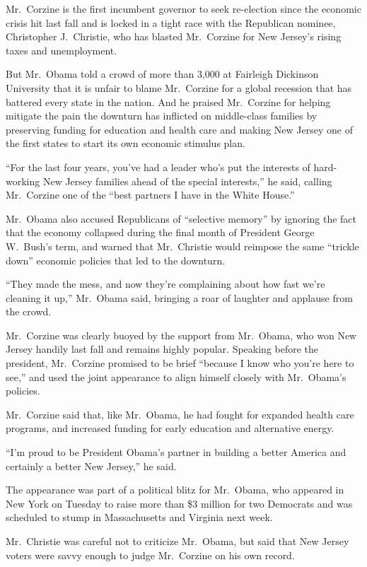 ﻿\documentclass[12pt]{article}
\begin{document}
Mr.~Corzine is the first incumbent governor to seek re-election since the economic crisis hit last
fall and is locked in a tight race with the Republican nominee, Christopher J.~Christie, who has
blasted Mr.~Corzine for New Jersey's rising taxes and unemployment.

But Mr.~Obama told a crowd of more than 3,000 at Fairleigh Dickinson University that it is unfair to
blame Mr.~Corzine for a global recession that has battered every state in the nation. And he praised
Mr.~Corzine for helping mitigate\cite{mitigate} the pain the downturn has inflicted on middle-class
families by preserving funding for education and health care and making New Jersey one of the first
states to start its own economic stimulus plan.

``For the last four years, you've had a leader who's put the interests of hard-working New Jersey
families ahead of the special interests,'' he said, calling Mr.~Corzine one of the ``best partners I
have in the White House.''

Mr.~Obama also accused Republicans of ``selective memory'' by ignoring the fact that the economy
collapsed during the final month of President George W.~Bush's term, and warned that Mr.~Christie
would reimpose the same ``trickle down'' economic policies that led to the downturn.

``They made the mess, and now they're complaining about how fast we're cleaning it up,'' Mr.~Obama
said, bringing a roar of laughter and applause from the crowd.

Mr.~Corzine was clearly buoyed by the support from Mr.~Obama, who won New Jersey handily last fall
and remains highly popular. Speaking before the president, Mr.~Corzine promised to be brief
``because I know who you're here to see,'' and used the joint appearance to align himself closely
with Mr.~Obama's policies.

Mr.~Corzine said that, like Mr.~Obama, he had fought for expanded health care programs, and
increased funding for early education and alternative energy.

``I'm proud to be President Obama's partner in building a better America and certainly a better New
Jersey,'' he said.

The appearance was part of a political blitz for Mr.~Obama, who appeared in New York on Tuesday to
raise more than \$3 million for two Democrats and was scheduled to stump in Massachusetts and
Virginia next week.

Mr.~Christie was careful not to criticize Mr.~Obama, but said that New Jersey voters were
savvy\cite{savvy} enough to judge Mr.~Corzine on his own record.
\end{document}
